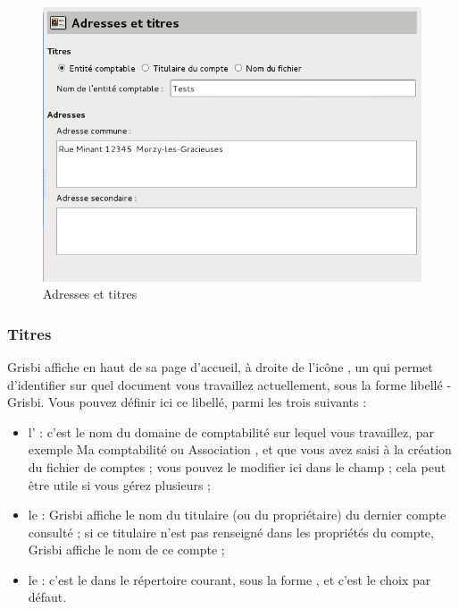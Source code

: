 \ifIllustration
\begin{figure}[htbp]
\begin{center}
\includegraphics[scale=0.5]{image/screenshot/setup_adresses}
\end{center}
\caption{Adresses et titres}
\label{setup-adresses-img}
\end{figure}
\fi


\subsubsection{Titres\label{setup-display-addresses-titles}}

Grisbi affiche en haut de sa page d'accueil, à droite de l'icône , un  qui permet d'identifier sur quel document vous travaillez actuellement, sous la forme \og libellé - Grisbi\fg{}. Vous pouvez définir ici ce libellé, parmi les trois suivants :

\begin{itemize}
	\item l' : c'est le nom du domaine de comptabilité sur lequel vous travaillez, par exemple \og Ma comptabilité \fg{} ou \og Association \fg{}, et que vous avez saisi à la création du fichier de comptes ; vous pouvez le modifier ici dans le champ  ; cela peut être utile si vous gérez plusieurs  ;
	\item le  : Grisbi affiche le nom du titulaire (ou du propriétaire) du dernier compte consulté ; si ce titulaire n'est pas renseigné dans les propriétés du compte, Grisbi affiche le nom de ce compte ;
	\item le  : c'est le  dans le répertoire courant, sous la forme , et c'est le choix par défaut.
\end{itemize}


